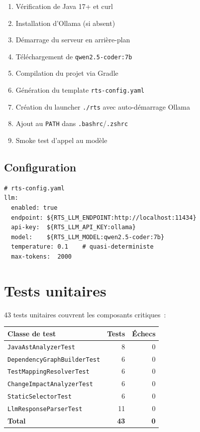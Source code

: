 \documentclass[12pt,a4paper]{article}
\begin{document}
\begin{enumerate}[noitemsep, label=\arabic{enumi}.~]
  \item Vérification de Java 17+ et curl
  \item Installation d'Ollama (si absent)
  \item Démarrage du serveur en arrière-plan
  \item Téléchargement de \texttt{qwen2.5-coder:7b}
  \item Compilation du projet via Gradle
  \item Génération du template \texttt{rts-config.yaml}
  \item Création du launcher \texttt{./rts} avec auto-démarrage Ollama
  \item Ajout au \texttt{PATH} dans \texttt{.bashrc}/\texttt{.zshrc}
  \item Smoke test d'appel au modèle
\end{enumerate}

\subsection{Configuration}

\begin{lstlisting}[language={}]
# rts-config.yaml
llm:
  enabled: true
  endpoint: ${RTS_LLM_ENDPOINT:http://localhost:11434}
  api-key:  ${RTS_LLM_API_KEY:ollama}
  model:    ${RTS_LLM_MODEL:qwen2.5-coder:7b}
  temperature: 0.1    # quasi-deterministe
  max-tokens:  2000
\end{lstlisting}

\section{Tests unitaires}

43 tests unitaires couvrent les composants critiques~:

\begin{center}
\begin{tabular}{lrr}
\toprule
\textbf{Classe de test} & \textbf{Tests} & \textbf{Échecs} \\
\midrule
\texttt{JavaAstAnalyzerTest}      & 8  & 0 \\
\texttt{DependencyGraphBuilderTest} & 6  & 0 \\
\texttt{TestMappingResolverTest}   & 6  & 0 \\
\texttt{ChangeImpactAnalyzerTest}  & 6  & 0 \\
\texttt{StaticSelectorTest}        & 6  & 0 \\
\texttt{LlmResponseParserTest}     & 11 & 0 \\
\midrule
\textbf{Total}                     & \textbf{43} & \textbf{0} \\
\bottomrule
\end{tabular}
\end{center}
\end{document}
